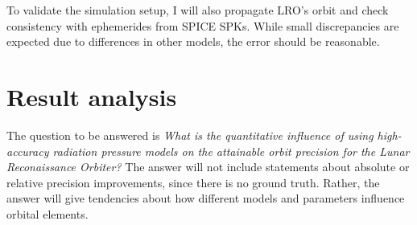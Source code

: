 \documentclass[parskip=full,DIV=15]{scrartcl}
\begin{document}
To validate the simulation setup, I will also propagate LRO's orbit and check consistency with ephemerides from SPICE SPKs. While small discrepancies are expected due to differences in other models, the error should be reasonable.





\section{Result analysis}\label{sec:result-analysis}
The question to be answered is \textit{What is the quantitative influence of using high-accuracy radiation pressure models on the attainable orbit precision for the Lunar Reconaissance Orbiter?} The answer will not include statements about absolute or relative precision improvements, since there is no ground truth. Rather, the answer will give tendencies about how different models and parameters influence orbital elements.
\end{document}
